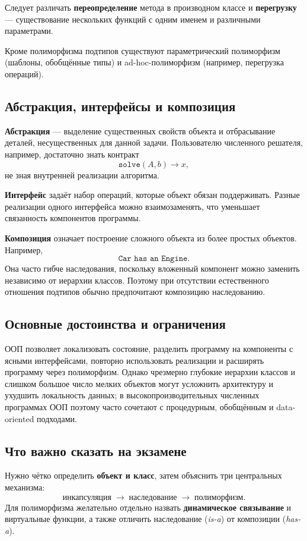 Следует различать \textbf{переопределение} метода в производном классе и \textbf{перегрузку} --- существование нескольких функций с одним именем и различными параметрами.

Кроме полиморфизма подтипов существуют параметрический полиморфизм (шаблоны, обобщённые типы) и ad-hoc-полиморфизм (например, перегрузка операций).

\subsection{Абстракция, интерфейсы и композиция}

\textbf{Абстракция} --- выделение существенных свойств объекта и отбрасывание деталей, несущественных для данной задачи. Пользователю численного решателя, например, достаточно знать контракт
\[
\texttt{solve}(A,b)\longrightarrow x,
\]
не зная внутренней реализации алгоритма.

\textbf{Интерфейс} задаёт набор операций, которые объект обязан поддерживать. Разные реализации одного интерфейса можно взаимозаменять, что уменьшает связанность компонентов программы.

\textbf{Композиция} означает построение сложного объекта из более простых объектов. Например,
\[
\texttt{Car has an Engine}.
\]
Она часто гибче наследования, поскольку вложенный компонент можно заменить независимо от иерархии классов. Поэтому при отсутствии естественного отношения подтипов обычно предпочитают композицию наследованию.

\subsection{Основные достоинства и ограничения}

ООП позволяет локализовать состояние, разделить программу на компоненты с ясными интерфейсами, повторно использовать реализации и расширять программу через полиморфизм. Однако чрезмерно глубокие иерархии классов и слишком большое число мелких объектов могут усложнить архитектуру и ухудшить локальность данных; в высокопроизводительных численных программах ООП поэтому часто сочетают с процедурным, обобщённым и data-oriented подходами.

\subsection{Что важно сказать на экзамене}

Нужно чётко определить \textbf{объект и класс}, затем объяснить три центральных механизма:
\[
\boxed{\text{инкапсуляция}\;\longrightarrow\;\text{наследование}\;\longrightarrow\;\text{полиморфизм}}.
\]
Для полиморфизма желательно отдельно назвать \textbf{динамическое связывание} и виртуальные функции, а также отличить наследование (\textit{is-a}) от композиции (\textit{has-a}).

\newpage
